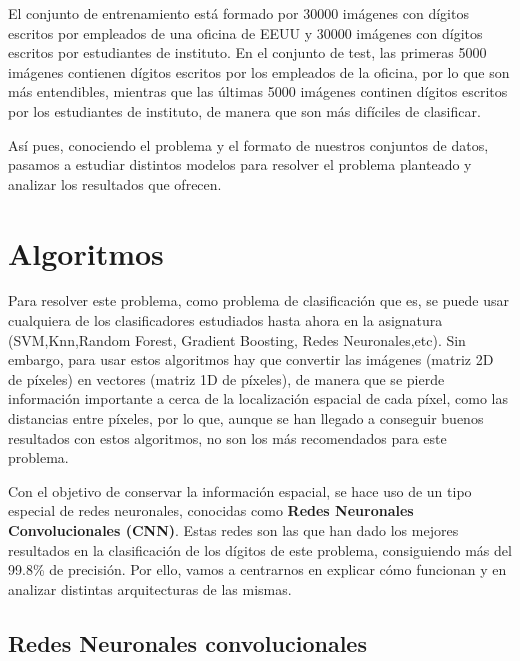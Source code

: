 \documentclass[a4paper,11pt]{article}
\begin{document}
El conjunto de entrenamiento está formado por 30000 imágenes con dígitos escritos por empleados de una oficina de EEUU y 30000 imágenes 
con dígitos escritos por estudiantes de instituto. En el conjunto de test, las primeras 5000 imágenes contienen dígitos escritos por los empleados de la oficina, por lo que son más entendibles, mientras que las últimas 5000 imágenes continen dígitos escritos por los estudiantes de instituto, de manera que son más difíciles de clasificar. 

Así pues, conociendo el problema y el formato de nuestros conjuntos de datos, pasamos a estudiar distintos modelos para resolver el problema planteado y analizar los resultados que ofrecen. 

\newpage
\section{Algoritmos}

Para resolver este problema, como problema de clasificación que es, se puede usar cualquiera de los clasificadores estudiados hasta ahora en la asignatura (SVM,Knn,Random Forest, Gradient Boosting, Redes Neuronales,etc). Sin embargo, para usar estos algoritmos hay que convertir las imágenes (matriz 2D de píxeles) en vectores (matriz 1D de píxeles), de manera que se pierde información importante a cerca de la localización espacial de cada píxel, como las distancias entre píxeles, por lo que, aunque se han llegado a conseguir buenos resultados con estos algoritmos, no son los más recomendados para este problema. 

Con el objetivo de conservar la información espacial, se hace uso de un tipo especial de redes neuronales, conocidas como \textbf{Redes Neuronales Convolucionales (CNN)}. Estas redes son las que han dado los mejores resultados en la clasificación de los dígitos de este problema, consiguiendo más del 99.8\% de precisión. Por ello, vamos a centrarnos en explicar cómo funcionan y en analizar distintas arquitecturas de las mismas.

\subsection{Redes Neuronales convolucionales}
\end{document}
